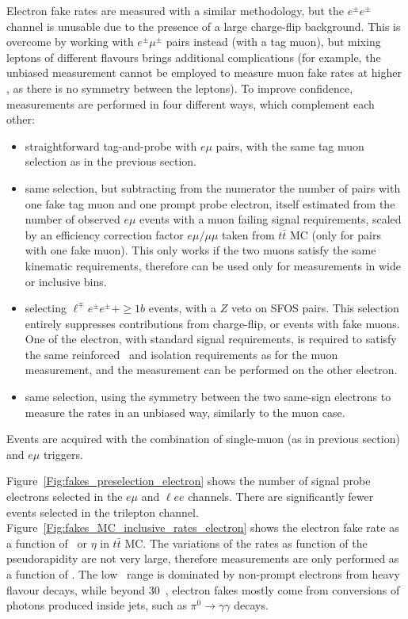 Electron fake rates are measured with a similar methodology, but the $e^\pm e^\pm$ channel is unusable due to the presence of a large charge-flip background. 
This is overcome by working with $e^\pm\mu^\pm$ pairs instead (with a tag muon), but mixing leptons of different flavours brings additional complications 
(for example, the unbiased measurement cannot be employed to measure muon fake rates at higher \pt, as there is no symmetry between the leptons). 
To improve confidence, measurements are performed in four different ways, which complement each other: 
\begin{itemize}
\item straightforward tag-and-probe with $e\mu$ pairs, with the same tag muon selection as in the previous section. 
\item same selection, but subtracting from the numerator the number of pairs with one fake tag muon and one prompt probe electron, 
itself estimated from the number of observed $e\mu$ events with a muon failing signal requirements, 
scaled by an efficiency correction factor $e\mu/\mu\mu$ taken from $t\bar t$ MC (only for pairs with one fake muon). 
This only works if the two muons satisfy the same kinematic requirements, therefore can be used only for measurements in wide or inclusive bins. 
\item selecting $\ell^\mp e^\pm e^\pm+\ge 1b$ events, with a $Z$ veto on SFOS pairs. 
This selection entirely suppresses contributions from charge-flip, or events with fake muons. 
One of the electron, with standard signal requirements, is required to satisfy the same reinforced \pt\ and isolation requirements as for the muon measurement,
and the measurement can be performed on the other electron. 
\item same selection, using the symmetry between the two same-sign electrons to measure the rates in an unbiased way, similarly to the muon case. 
\end{itemize}
Events are acquired with the combination of single-muon (as in previous section) and $e\mu$ triggers. 


Figure~\ref{Fig:fakes_preselection_electron} shows the number of signal probe electrons selected in the $e\mu$ and $\ell ee$ channels. 
There are significantly fewer events selected in the trilepton channel. 
Figure~\ref{Fig:fakes_MC_inclusive_rates_electron} shows the electron fake rate as a function of \pt\ or $\eta$ in $t\bar t$ MC. 
The variations of the rates as function of the pseudorapidity are not very large, 
therefore measurements are only performed as a function of \pt. 
The low \pt\ range is dominated by non-prompt electrons from heavy flavour decays, while beyond 30~\GeV, 
electron fakes mostly come from conversions of photons produced inside jets, such as $\pi^0\to\gamma\gamma$ decays. 

